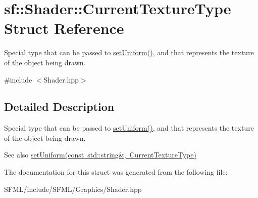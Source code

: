 \hypertarget{structsf_1_1_shader_1_1_current_texture_type}{}\section{sf\+:\+:Shader\+:\+:Current\+Texture\+Type Struct Reference}
\label{structsf_1_1_shader_1_1_current_texture_type}


Special type that can be passed to \mbox{\hyperlink{classsf_1_1_shader_abf78e3bea1e9b0bab850b6b0a0de29c7}{set\+Uniform()}}, and that represents the texture of the object being drawn.  




{\ttfamily \#include $<$Shader.\+hpp$>$}



\subsection{Detailed Description}
Special type that can be passed to \mbox{\hyperlink{classsf_1_1_shader_abf78e3bea1e9b0bab850b6b0a0de29c7}{set\+Uniform()}}, and that represents the texture of the object being drawn. 

\begin{DoxySeeAlso}{See also}
\mbox{\hyperlink{classsf_1_1_shader_ab18f531e1f726b88fec1cf5a1e6af26d}{set\+Uniform(const std\+::string\&, Current\+Texture\+Type)}} \begin{DoxyVerb}\end{DoxyVerb}
 
\end{DoxySeeAlso}


The documentation for this struct was generated from the following file\+:\begin{DoxyCompactItemize}
\item 
S\+F\+M\+L/include/\+S\+F\+M\+L/\+Graphics/Shader.\+hpp\end{DoxyCompactItemize}
